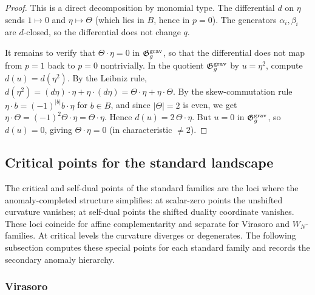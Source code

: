 \begin{proof}
This is a direct decomposition by monomial type.
The differential $d$ on $\eta$ sends $1 \mapsto 0$ and
$\eta \mapsto \Theta$ (which lies in $B$, hence in $p = 0$).
The generators $\alpha_i, \beta_i$ are $d$-closed, so the
differential does not change $q$.

It remains to verify that $\Theta \cdot \eta = 0$ in
$\mathfrak{G}_g^{\mathrm{grav}}$, so that the differential does not
map from $p = 1$ back to $p = 0$ nontrivially.
In the quotient $\mathfrak{G}_g^{\mathrm{grav}}$ by $u = \eta^2$,
compute $d(u) = d(\eta^2)$. By the Leibniz rule,
$d(\eta^2) = (d\eta) \cdot \eta + \eta \cdot (d\eta)
= \Theta \cdot \eta + \eta \cdot \Theta$.
By the skew-commutation rule
$\eta \cdot b = (-1)^{|b|} b \cdot \eta$ for $b \in B$,
and since $|\Theta| = 2$ is even, we get
$\eta \cdot \Theta = (-1)^{2} \Theta \cdot \eta
= \Theta \cdot \eta$.
Hence $d(u) = 2\,\Theta \cdot \eta$.
But $u = 0$ in $\mathfrak{G}_g^{\mathrm{grav}}$, so
$d(u) = 0$, giving $\Theta \cdot \eta = 0$
(in characteristic $\neq 2$).
\end{proof}

\subsection{Critical points for the standard landscape}


The critical and self-dual points of the standard families are
the loci where the anomaly-completed structure simplifies:
at scalar-zero points the unshifted curvature vanishes; at
self-dual points the shifted duality coordinate vanishes. These
loci coincide for affine complementarity and separate for Virasoro
and \(W_N\)-families. At critical levels the curvature diverges or
degenerates.
The following subsection computes these special points for each
standard family and records the secondary anomaly hierarchy.

\subsubsection{Virasoro}

